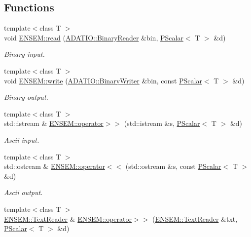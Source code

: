 \subsection*{Functions}
\begin{DoxyCompactItemize}
\item 
{\footnotesize template$<$class T $>$ }\\void \mbox{\hyperlink{group__primscalar_ga1d9173117dec6193e9c26c211973310b}{E\+N\+S\+E\+M\+::read}} (\mbox{\hyperlink{classADATIO_1_1BinaryReader}{A\+D\+A\+T\+I\+O\+::\+Binary\+Reader}} \&bin, \mbox{\hyperlink{classENSEM_1_1PScalar}{P\+Scalar}}$<$ T $>$ \&d)
\begin{DoxyCompactList}\small\item\em Binary input. \end{DoxyCompactList}\item 
{\footnotesize template$<$class T $>$ }\\void \mbox{\hyperlink{group__primscalar_ga7db0b2a7539f81de4777d87b90de73c6}{E\+N\+S\+E\+M\+::write}} (\mbox{\hyperlink{classADATIO_1_1BinaryWriter}{A\+D\+A\+T\+I\+O\+::\+Binary\+Writer}} \&bin, const \mbox{\hyperlink{classENSEM_1_1PScalar}{P\+Scalar}}$<$ T $>$ \&d)
\begin{DoxyCompactList}\small\item\em Binary output. \end{DoxyCompactList}\item 
{\footnotesize template$<$class T $>$ }\\std\+::istream \& \mbox{\hyperlink{group__primscalar_gae4d02a7c5e314405b8a8efa45f1f7e62}{E\+N\+S\+E\+M\+::operator$>$$>$}} (std\+::istream \&s, \mbox{\hyperlink{classENSEM_1_1PScalar}{P\+Scalar}}$<$ T $>$ \&d)
\begin{DoxyCompactList}\small\item\em Ascii input. \end{DoxyCompactList}\item 
{\footnotesize template$<$class T $>$ }\\std\+::ostream \& \mbox{\hyperlink{group__primscalar_ga48eed9feafd51dc2ff5915922fc68275}{E\+N\+S\+E\+M\+::operator$<$$<$}} (std\+::ostream \&s, const \mbox{\hyperlink{classENSEM_1_1PScalar}{P\+Scalar}}$<$ T $>$ \&d)
\begin{DoxyCompactList}\small\item\em Ascii output. \end{DoxyCompactList}\item 
{\footnotesize template$<$class T $>$ }\\\mbox{\hyperlink{classENSEM_1_1TextReader}{E\+N\+S\+E\+M\+::\+Text\+Reader}} \& \mbox{\hyperlink{group__primscalar_gae6420bec950e94bc85d5f04a7eee20fe}{E\+N\+S\+E\+M\+::operator$>$$>$}} (\mbox{\hyperlink{classENSEM_1_1TextReader}{E\+N\+S\+E\+M\+::\+Text\+Reader}} \&txt, \mbox{\hyperlink{classENSEM_1_1PScalar}{P\+Scalar}}$<$ T $>$ \&d)

\end{DoxyCompactItemize}
